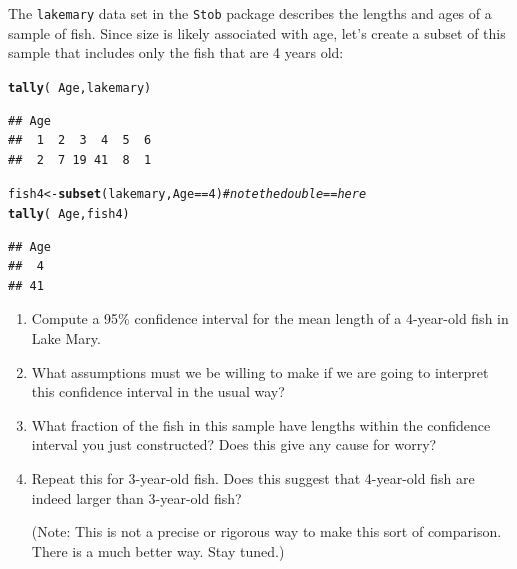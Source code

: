 \documentclass[twoside]{book}\usepackage[]{graphicx}\usepackage[]{xcolor}
\makeatletter
\newcommand{\hlnum}[1]{\textcolor[rgb]{0.686,0.059,0.569}{#1}}%
\newcommand{\hlcom}[1]{\textcolor[rgb]{0.678,0.584,0.686}{\textit{#1}}}%
\newcommand{\hlopt}[1]{\textcolor[rgb]{0,0,0}{#1}}%
\newcommand{\hlstd}[1]{\textcolor[rgb]{0.345,0.345,0.345}{#1}}%
\newcommand{\hlkwb}[1]{\textcolor[rgb]{0.69,0.353,0.396}{#1}}%
\newcommand{\hlkwd}[1]{\textcolor[rgb]{0.737,0.353,0.396}{\textbf{#1}}}%
\newenvironment{kframe}{%
 \def\at@end@of@kframe{}%
 \ifinner\ifhmode%
  \def\at@end@of@kframe{\end{minipage}}%
  \begin{minipage}{\columnwidth}%
 \fi\fi%
 \def\FrameCommand##1{\hskip\@totalleftmargin \hskip-\fboxsep
 \colorbox{shadecolor}{##1}\hskip-\fboxsep
     \hskip-\linewidth \hskip-\@totalleftmargin \hskip\columnwidth}%
 \MakeFramed {\advance\hsize-\width
   \@totalleftmargin\z@ \linewidth\hsize
   \@setminipage}}%
 {\par\unskip\endMakeFramed%
 \at@end@of@kframe}
\newenvironment{knitrout}{}{} %
\newcommand{\Rindex}[1]{\index{\texttt{#1}}}
\newcommand{\dataframe}[1]{{\color{blue!80!black}\texttt{#1}}\Rindex{#1}}
\newcommand{\pkg}[1]{{\color{red!80!black}\texttt{#1}}\Rindex{#1}}
\makeatother
\begin{document}
\begin{problem}
	The \dataframe{lakemary} data set in the \pkg{Stob} package describes the 
	lengths and ages of a sample of fish.  Since size is likely associated with
	age, let's create a subset of this sample that includes only the fish 
	that are 4 years old:
\begin{knitrout}
\color{fgcolor}\begin{kframe}
\begin{alltt}
\hlkwd{tally}\hlstd{(}\hlopt{~}\hlstd{Age, lakemary)}
\end{alltt}
\begin{verbatim}
## Age
##  1  2  3  4  5  6 
##  2  7 19 41  8  1
\end{verbatim}
\begin{alltt}
\hlstd{fish4} \hlkwb{<-} \hlkwd{subset}\hlstd{(lakemary, Age}\hlopt{==}\hlnum{4}\hlstd{)}  \hlcom{# note the double == here}
\hlkwd{tally}\hlstd{(}\hlopt{~}\hlstd{Age, fish4)}
\end{alltt}
\begin{verbatim}
## Age
##  4 
## 41
\end{verbatim}
\end{kframe}
\end{knitrout}
	\begin{enumerate}
		\item
			Compute a 95\% confidence interval for the mean length 
			of a 4-year-old fish in Lake Mary.
		\item
			What assumptions must we be willing to make if we are 
			going to interpret this confidence interval in the usual way?
		\item
			What fraction of the fish in this sample have lengths within
			the confidence interval you just constructed?  Does this give 
			any cause for worry?
		\item
			Repeat this for 3-year-old fish.  Does this suggest that 
			4-year-old fish are indeed larger than 3-year-old fish?  
			
			(Note: This is not a precise or rigorous way to make this sort of comparison.
			There is a much better way. Stay tuned.)
	\end{enumerate}
\end{problem}
\end{document}
